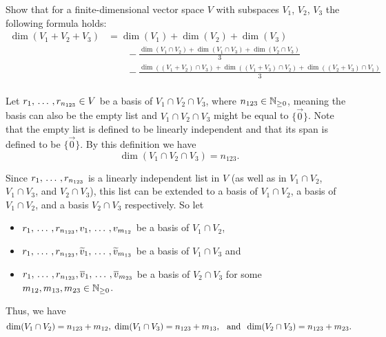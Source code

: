 \begin{xrcs}
  Show that for a finite-dimensional vector space $V$ with subspaces $V_1$, $V_2$, $V_3$ the following formula holds:
  \begin{equation}
  \begin{aligned}
    \dim (V_1 + V_2 + V_3)  &= \dim (V_1) + \dim (V_2) + \dim (V_3) \\
    & \qquad - \frac{\dim (V_1 \cap V_2) + \dim (V_1 \cap V_3) + \dim (V_2 \cap V_3)}{3} \\
    & \qquad - \frac{ \dim \left(  (V_1 + V_2) \cap V_3 \right) + \dim \left( (V_1 + V_3) \cap V_2 \right)+ \dim \left( (V_2 + V_3) \cap V_1 \right) }{3} \\
  \end{aligned}
\end{equation}

 Let $r_1, {\, \ldots \,\,}, r_{n_{123}} \in V$ be a basis of $V_1 \cap V_2 \cap V_3$, where $n_{123} \in \mathbb{N}_{\geq 0}$, meaning the basis can also be the empty list and $V_1 \cap V_2 \cap V_3$ might be equal to $\{\vec 0\}$. Note that the empty list is defined to be linearly independent and that its span is defined to be $\{\vec 0\}$. By this definition we have
\begin{equation}
  \label{eq: dim for V_1 cap V_2 cap V_3}
  \dim (V_1 \cap V_2 \cap V_3) = n_{123}.
\end{equation}

Since $r_1, {\, \ldots \,\,}, r_{n_{123}}$ is a linearly independent list in $V$ (as well as in $V_1 \cap V_2$, $V_1 \cap V_3$, and $V_2 \cap V_3$), this list can be extended to a basis of $V_1 \cap V_2$, a basis of $V_1 \cap V_2$, and a basis $V_2 \cap V_3$ respectively. So let
\begin{itemize}
  \item $r_1, {\, \ldots \,\,}, r_{n_{123}}, v_1, {\, \ldots \,\,}, v_{m_{12}}$ be a basis of $V_1 \cap V_2$,
  \item $r_1, {\, \ldots \,\,}, r_{n_{123}}, \widetilde{v}_1, {\, \ldots \,\,}, \widetilde{v}_{m_{13}}$ be a basis of $V_1 \cap V_3$ and
  \item $r_1, {\, \ldots \,\,}, r_{n_{123}}, \overline{v}_1, {\, \ldots \,\,}, \overline{v}_{m_{23}}$ be a basis of $V_2 \cap V_3$ for some $m_{12}, m_{13}, m_{23} \in \mathbb{N}_{\geq 0}$.
\end{itemize}

Thus, we have
\begin{equation}
  \label{eq: dim for V_1 cap V_2, V_1 cap V_3, V_2 cap V_3}
  \dim (V_1 \cap V_2) = n_{123} + m_{12}, \; \dim (V_1 \cap V_3) = n_{123} + m_{13}, \;\;\, \text{and}\;\; \dim (V_2 \cap V_3) = n_{123} + m_{23}.
\end{equation}


\end{xrcs}
